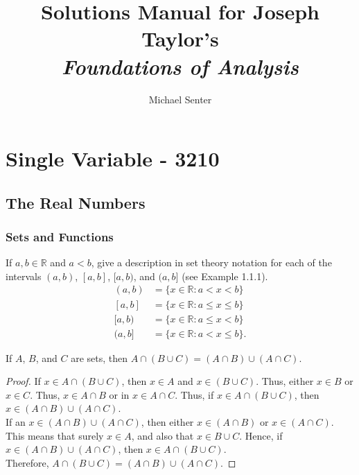 \documentclass[12pt]{book}
\newenvironment{theorem}[2][Theorem]{\begin{trivlist}
\item[\hskip \labelsep {\bfseries #1}\hskip \labelsep {\bfseries #2.}]}{\end{trivlist}}
\newenvironment{exercise}[2][Exercise]{\begin{trivlist}
\item[\hskip \labelsep {\bfseries #1}\hskip \labelsep {\bfseries #2.}]}{\end{trivlist}}
\begin{document}

\title{Solutions Manual for Joseph Taylor's \\ \emph{Foundations of Analysis}}%
\author{Michael Senter}
\date{}

\maketitle

\part{Single Variable - 3210}


\chapter{The Real Numbers}

\section{Sets and Functions}

\begin{exercise}{1.1.1} %
If $a, b \in \mathbb{R}$ and $a < b$, give a description in set theory notation for each of the intervals $(a, b)$, $[a, b]$, $[a, b)$, and $(a, b]$ (see Example 1.1.1).
\begin{align*}
	(a,b) &= \{x \in \mathbb{R} : a < x < b\} \\
	[a,b] &= \{x \in \mathbb{R} : a \leq x \leq b\} \\
	[a,b) &= \{x \in \mathbb{R} : a \leq x < b\} \\
	(a,b] &= \{x \in \mathbb{R} : a < x \leq b\}.
\end{align*}
\end{exercise}

\begin{theorem}{1.1.2}
If $A$, $B$, and $C$ are sets, then $A  \cap (B \cup C) = (A \cap B) \cup (A \cap C)$.
\end{theorem}
\begin{proof}
If  $x \in A  \cap (B \cup C)$, then $x \in A$ and $x \in (B \cup C)$. Thus, either $x \in B$ or $x \in C$. Thus, $x \in A \cap B$ or in $x \in A \cap C$. Thus, if $x \in A  \cap (B \cup C)$, then $x \in (A \cap B) \cup (A \cap C)$. \\
If an $x \in (A \cap B) \cup (A \cap C)$, then either $x \in (A \cap B)$ or $x \in (A \cap C)$. This means that surely $x \in A$, and also that $x \in B \cup C$. Hence, if $x \in (A \cap B) \cup (A \cap C)$, then $x \in A  \cap (B \cup C)$.\\
Therefore, $A  \cap (B \cup C) = (A \cap B) \cup (A \cap C)$.
\end{proof}
\end{document}
